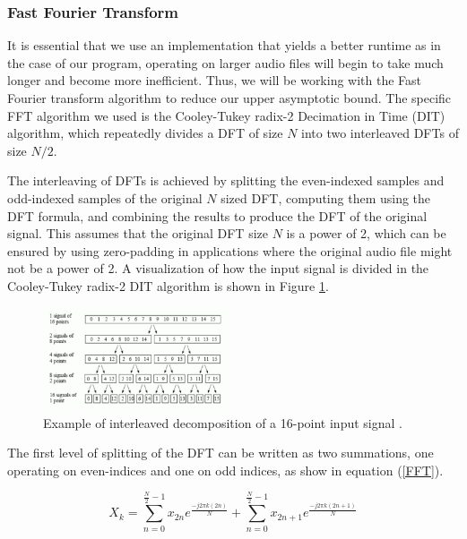 \documentclass[journal]{IEEEtran}
\begin{document}
\subsubsection{Fast Fourier Transform}
	\par {
		It is essential that we use an implementation that yields a 
		better runtime as in the case of our program, operating on 
		larger audio files will begin to take much longer and become more 
		inefficient. Thus, we will be working with the 
		Fast Fourier transform algorithm to reduce our upper 
		asymptotic bound. The specific FFT algorithm we used is the Cooley-Tukey 
		radix-2 Decimation in Time (DIT) algorithm, which repeatedly divides a 
		DFT of size $N$ into two interleaved DFTs of size $N / 2$.
	}
	\par{
		The interleaving of DFTs is achieved by splitting the even-indexed samples
		and odd-indexed samples of the original $N$ sized DFT, computing them using
		the DFT formula, and combining the results to produce the DFT of the 
		original signal. This assumes that the original DFT size $N$ is a 
		power of 2, which can be ensured by using zero-padding in applications 
		where the original audio file might not be a power of 2.
		A visualization of how the input signal is divided in the Cooley-Tukey
		radix-2 DIT algorithm is shown in Figure \ref{fig:dft-decomp}.
	}
	\begin{figure}[h]
		\centering
		\includegraphics[width=0.5\textwidth]{dft-decomp}
		\caption{Example of interleaved decomposition of a 16-point input signal
		\cite{DspGuide}.}
		\label{fig:dft-decomp}
	\end{figure}

	\par{
		The first level of splitting of the DFT
		can be written as two summations, one
		operating on even-indices and one on 
		odd indices, as show in equation (\ref{FFT}).

		\begin{equation}\label{FFT}
			\displaystyle X_k = \sum_{n=0}^{\frac{N}{2} - 1}x_{2n}e^{\displaystyle\frac{-j2\pi k(2n)}{N}}
			+ \sum_{n=0}^{\frac{N}{2} - 1}x_{2n + 1}e^{\displaystyle\frac{-j2\pi k(2n + 1)}{N}}
		\end{equation}
	}
\end{document}
